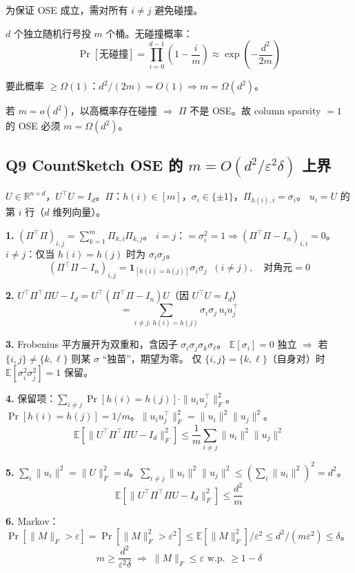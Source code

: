 \documentclass[11pt,a4paper]{ctexart}
\newcommand{\R}{\mathbb{R}}
\newcommand{\E}{\mathbb{E}}
\newcommand{\ind}[1]{\mathbf{1}_{[#1]}}
\begin{document}
为保证 OSE 成立，需对所有 $i\neq j$ 避免碰撞。

$d$ 个独立随机行号投 $m$ 个桶。无碰撞概率：
\[
\Pr[\text{无碰撞}] = \prod_{i=0}^{d-1}\!\left(1 - \frac{i}{m}\right) \approx \exp\!\left(-\frac{d^2}{2m}\right)
\]

要此概率 $\geq \Omega(1)$：$d^2/(2m) = O(1) \Rightarrow \boxed{m = \Omega(d^2)}$。

若 $m = o(d^2)$，以高概率存在碰撞 $\Rightarrow$ $\Pi$ 不是 OSE。故 column sparsity $=1$ 的 OSE 必须 $m=\Omega(d^2)$。


\subsection*{Q9 \quad CountSketch OSE 的 $m = O(d^2/\varepsilon^2\delta)$ 上界}

$U\in\R^{n\times d}$，$U^\top U = I_d$。$\Pi$：$h(i)\in[m]$，$\sigma_i\in\{\pm1\}$，$\Pi_{h(i),i}=\sigma_i$。
$u_i = U$ 的第 $i$ 行（$d$ 维列向量）。

\textbf{1.} $(\Pi^\top\Pi)_{i,j} = \sum_{k=1}^m \Pi_{k,i}\Pi_{k,j}$。
$i=j$：$=\sigma_i^2=1 \Rightarrow (\Pi^\top\Pi - I_n)_{i,i}=0$。
$i\neq j$：仅当 $h(i)=h(j)$ 时为 $\sigma_i\sigma_j$。
\[
\boxed{(\Pi^\top\Pi - I_n)_{i,j} = \ind{h(i)=h(j)}\sigma_i\sigma_j \;\;(i\neq j),\quad\text{对角元}=0}
\]

\textbf{2.}
$U^\top\Pi^\top\Pi U - I_d = U^\top(\Pi^\top\Pi - I_n)U$（因 $U^\top U = I_d$）
\[
\boxed{= \sum_{i\neq j:\,h(i)=h(j)} \sigma_i\sigma_j\, u_i u_j^\top}
\]

\textbf{3.} Frobenius 平方展开为双重和，含因子 $\sigma_i\sigma_j\sigma_k\sigma_\ell$。
$\E[\sigma_i]=0$ 独立 $\Rightarrow$ 若 $\{i,j\}\neq\{k,\ell\}$ 则某 $\sigma$ ``独苗''，期望为零。
仅 $\{i,j\}=\{k,\ell\}$（自身对）时 $\E[\sigma_i^2\sigma_j^2]=1$ 保留。

\textbf{4.} 保留项：$\sum_{i\neq j} \Pr[h(i)=h(j)]\cdot\|u_i u_j^\top\|_F^2$。
$\Pr[h(i)=h(j)] = 1/m$。$\|u_i u_j^\top\|_F^2 = \|u_i\|^2\|u_j\|^2$。
\[
\boxed{\E[\|U^\top\Pi^\top\Pi U - I_d\|_F^2] \leq \frac{1}{m}\sum_{i\neq j}\|u_i\|^2\|u_j\|^2}
\]

\textbf{5.} $\sum_i \|u_i\|^2 = \|U\|_F^2 = d$。$\sum_{i\neq j}\|u_i\|^2\|u_j\|^2 \leq (\sum_i\|u_i\|^2)^2 = d^2$。
\[
\boxed{\E[\|U^\top\Pi^\top\Pi U - I_d\|_F^2] \leq \frac{d^2}{m}}
\]

\textbf{6.} Markov：$\Pr[\|M\|_F > \varepsilon] = \Pr[\|M\|_F^2 > \varepsilon^2] \leq \E[\|M\|_F^2]/\varepsilon^2 \leq d^2/(m\varepsilon^2) \leq \delta$。
\[
\boxed{m \geq \frac{d^2}{\varepsilon^2\delta} \;\Rightarrow\; \|M\|_F \leq \varepsilon \text{ w.p. } \geq 1-\delta}
\]
\end{document}
